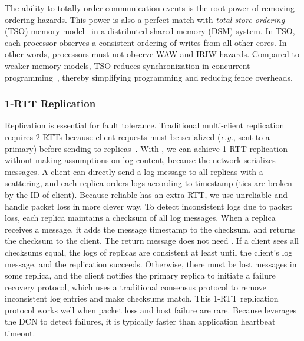 The ability to totally order communication events is the root power of removing ordering hazards.
This power is also a perfect match with \textit{total store ordering} (TSO) memory model~\cite{sewell2010x86} in a distributed shared memory (DSM) system. In TSO, each processor observes a consistent ordering of writes from all other cores. In other words, processors must not observe WAW and IRIW hazards.
Compared to weaker memory models, TSO reduces synchronization in concurrent programming~\cite{morrison2013fast,tassarotti2015verifying}, thereby simplifying programming and reducing fence overheads.

\subsubsection{1-RTT Replication}
\label{sec:replication}


Replication is essential for fault tolerance.
Traditional multi-client replication requires 2 RTTs because client requests must be serialized (\textit{e.g.}, sent to a primary) before sending to replicas~\cite{park2019exploiting}.
With \sys{}, we can achieve 1-RTT replication without making assumptions on log content, because the network serializes messages.
A client can directly send a log message to all replicas with a scattering, and each replica orders logs according to timestamp (ties are broken by the ID of client).
Because reliable \sys{} has an extra RTT, we use unreliable \sys{} and handle packet loss in more clever way.
To detect inconsistent logs due to packet loss, each replica maintains a checksum of all log messages. When a replica receives a message, it adds the message timestamp to the checksum, and returns the checksum to the client. The return message does not need \sys{}. If a client sees all checksums equal, the logs of replicas are consistent at least until the client's log message, and the replication succeeds. Otherwise, there must be lost messages in some replica, and the client notifies the primary replica to initiate a failure recovery protocol, which uses a traditional consensus protocol to remove inconsistent log entries and make checksums match. This 1-RTT replication protocol works well when packet loss and host failure are rare. Because \sys{} leverages the DCN to detect failures, it is typically faster than application heartbeat timeout.

